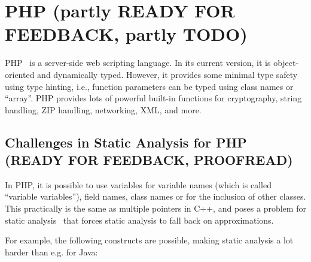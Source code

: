 \chapter{PHP (partly READY FOR FEEDBACK, partly TODO)}
\label{php}

PHP~\cite{php-in-action} is a server-side web scripting language. In its current version, it is object-oriented and dynamically typed. However, it provides some minimal type safety using type hinting, i.e., function parameters can be typed using class names or ``array''. PHP provides lots of powerful built-in functions for cryptography, string handling, ZIP handling, networking, XML, and more.

\section{Challenges in Static Analysis for PHP (READY FOR FEEDBACK, PROOFREAD)}

In PHP, it is possible to use variables for variable names (which is called ``variable variables''), field names, class names or for the inclusion of other classes. This practically is the same as multiple pointers in C++, and poses a problem for static analysis~\cite{tamper-resistance} that forces static analysis to fall back on approximations.

For example, the following constructs are possible, making static analysis a lot harder than e.g. for Java:



